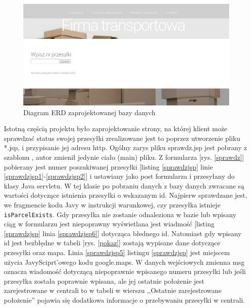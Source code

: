 \documentclass[eng,printmode,oneside]{mgr}
\begin{document}
\begin{figure}[ht!]
\centering
\includegraphics[width=90ex]{nieMaPrzesylki.png}
\caption{Diagram ERD zaprojektowanej bazy danych}
\label{niema}
\end{figure}

Istotną częścią projektu było zaprojektowanie strony, na której
klient może sprawdzać status swojej przesyłki zrealizowane jest to poprzez utworzenie pliku
*.jsp, i przypisanie jej adresu http. Ogólny zarys pliku sprawdz.jsp jest
pobrany z szablonu \cite{szablon}, autor zmienił jedynie ciało (main) pliku. Z
formularza [rys. \ref{sprawdz}] pobierany jest numer poszukiwanej przesyłki
[listing \ref{sprawdzjsp} linie \ref{sprawdzjsp1}-\ref{sprawdzjsp2}] i ustawiany jako
post formularza i przesyłany do klasy Java servletu. W tej klasie po
pobraniu danych z bazy danych zwracane są wartości dotyczące istnienia przesyłki
o wskazanym id. Najpierw sprawdzane jest, we fragmencie kodu Javy w instrukcji
warunkowej, czy przesyłka istnieje \texttt{isParcelExists}. Gdy przesyłka
nie zostanie odnaleziona w bazie lub wpisany ciąg w formularzu jest niepoprawny
wyświetlana jest wiadmość [listing \ref{sprawdzjsp} linia \ref{sprawdzjsp6}]
dotycząca błednego id. Natomiast gdy wpisany id jest bezbłędne w tabeli [rys.
\ref{pokaz}] zostają wypisane dane dotyczące przesyłki oraz mapa. Linia \ref{sprawdzjsp5}
listingu \ref{sprawdzjsp} jest miejscem użycia JavySciprt'owego kodu
google.maps. W danych wejściowych zmienna msg oznacza wiadomość dotyczącą
niepoprawnie wpisanego numeru przesyłki lub jeśli przesyłka została poprawnie
wpisana, ale jej ostatnie położenie jest zarejestrowane w centrali to w tabeli
w wierszu ,,Ostatnie zarejestrowane położenie'' pojawia się dodatkowa informacje
o przebywaniu przesyłki w centrali.
\end{document}
